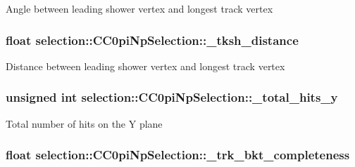 Angle between leading shower vertex and longest track vertex \hypertarget{classselection_1_1CC0piNpSelection_a73d772bb569336b56a3f14cee752e2f3}{
\subsubsection[{\-\_\-tksh\-\_\-distance}]{\setlength{\rightskip}{0pt plus 5cm}float selection\-::\-C\-C0pi\-Np\-Selection\-::\-\_\-tksh\-\_\-distance\hspace{0.3cm}{\ttfamily [private]}}}\label{classselection_1_1CC0piNpSelection_a73d772bb569336b56a3f14cee752e2f3}
Distance between leading shower vertex and longest track vertex \hypertarget{classselection_1_1CC0piNpSelection_a819d1d973e74bcd2ad82aa01ea24ac37}{
\subsubsection[{\-\_\-total\-\_\-hits\-\_\-y}]{\setlength{\rightskip}{0pt plus 5cm}unsigned int selection\-::\-C\-C0pi\-Np\-Selection\-::\-\_\-total\-\_\-hits\-\_\-y\hspace{0.3cm}{\ttfamily [private]}}}\label{classselection_1_1CC0piNpSelection_a819d1d973e74bcd2ad82aa01ea24ac37}
Total number of hits on the Y plane \hypertarget{classselection_1_1CC0piNpSelection_aab22ce289e2d4a109440369e30fddf52}{
\subsubsection[{\-\_\-trk\-\_\-bkt\-\_\-completeness}]{\setlength{\rightskip}{0pt plus 5cm}float selection\-::\-C\-C0pi\-Np\-Selection\-::\-\_\-trk\-\_\-bkt\-\_\-completeness\hspace{0.3cm}{\ttfamily [private]}}}\label{classselection_1_1CC0piNpSelection_aab22ce289e2d4a109440369e30fddf52}
